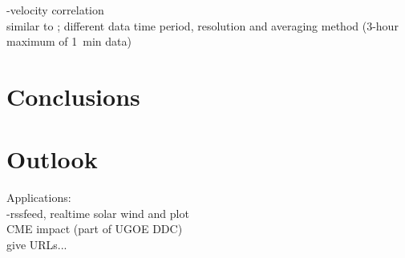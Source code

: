 \Kp-velocity correlation\\
similar to \citet{Elliott2013}; different data time period, resolution and averaging method (3-hour maximum of 1~min data)\\


\section{Conclusions}

\section{Outlook}

Applications:\\
\Kp-rssfeed, realtime solar wind and \Kp{} plot\\
CME \Kp{} impact (part of UGOE DDC)\\
give URLs...\\
